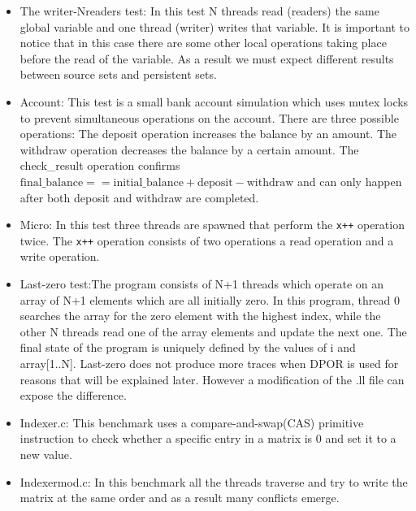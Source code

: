 \begin{itemize}
\item The writer-Nreaders test: In this test N threads read (readers) the same global variable and one thread (writer) writes that variable. It is important 
to notice that in this case there are some other local operations taking place before the read of the variable. As a result we must expect different results between 
source sets and persistent sets.

\item Account: This test is a small bank account simulation which uses mutex locks to prevent simultaneous operations on the account.
There are three possible operations: The deposit operation increases the balance by an amount. The withdraw operation decreases the balance by a certain amount. The check\_result operation confirms 
$\text{final\_balance} == \text{initial\_balance} + \text{deposit} - \text{withdraw}$ and can only happen after both deposit and withdraw are completed.

\item Micro: In this test three threads are spawned that perform the \verb|x++| operation twice. The \verb|x++| operation
consists of two operations a read operation and a write operation.

\item Last-zero test:The program consists of N+1 threads which operate on an array of
N+1 elements which are all initially zero. In this program, thread 0
searches the array for the zero element with the highest index, while
the other N threads read one of the array elements and update the
next one. The final state of the program is uniquely defined by the
values of i and array[1..N]. Last-zero does not produce more traces when DPOR is used for reasons
that will be explained later. However a modification of the .ll file can expose the difference.

\item Indexer.c: This benchmark uses a compare-and-swap(CAS) primitive instruction to check
whether a specific entry in a matrix is 0 and set it to a new
value. 

\item Indexermod.c: In this benchmark all the threads traverse and try to write the matrix at the same
order and as a result many conflicts emerge.


\end{itemize}

